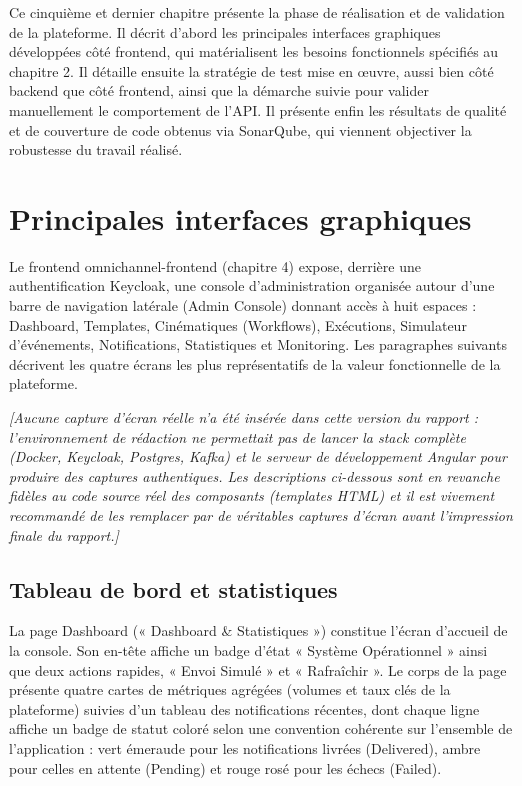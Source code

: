 \documentclass[12pt,a4paper]{report}
\newcommand{\placeholder}[1]{\par\smallskip\noindent\textcolor{placeholderred}{\itshape [#1]}\par\smallskip}
\begin{document}
Ce cinquième et dernier chapitre présente la phase de réalisation et de validation de la plateforme. Il décrit d'abord les principales interfaces graphiques développées côté frontend, qui matérialisent les besoins fonctionnels spécifiés au chapitre 2. Il détaille ensuite la stratégie de test mise en \oe uvre, aussi bien côté backend que côté frontend, ainsi que la démarche suivie pour valider manuellement le comportement de l'API. Il présente enfin les résultats de qualité et de couverture de code obtenus via SonarQube, qui viennent objectiver la robustesse du travail réalisé.

\section{Principales interfaces graphiques}

Le frontend omnichannel-frontend (chapitre 4) expose, derrière une authentification Keycloak, une console d'administration organisée autour d'une barre de navigation latérale (Admin Console) donnant accès à huit espaces : Dashboard, Templates, Cinématiques (Workflows), Exécutions, Simulateur d'événements, Notifications, Statistiques et Monitoring. Les paragraphes suivants décrivent les quatre écrans les plus représentatifs de la valeur fonctionnelle de la plateforme.

\placeholder{Aucune capture d'écran réelle n'a été insérée dans cette version du rapport : l'environnement de rédaction ne permettait pas de lancer la stack complète (Docker, Keycloak, Postgres, Kafka) et le serveur de développement Angular pour produire des captures authentiques. Les descriptions ci-dessous sont en revanche fidèles au code source réel des composants (templates HTML) et il est vivement recommandé de les remplacer par de véritables captures d'écran avant l'impression finale du rapport.}

\subsection{Tableau de bord et statistiques}

La page Dashboard (« Dashboard \& Statistiques ») constitue l'écran d'accueil de la console. Son en-tête affiche un badge d'état « Système Opérationnel » ainsi que deux actions rapides, « Envoi Simulé » et « Rafraîchir ». Le corps de la page présente quatre cartes de métriques agrégées (volumes et taux clés de la plateforme) suivies d'un tableau des notifications récentes, dont chaque ligne affiche un badge de statut coloré selon une convention cohérente sur l'ensemble de l'application : vert émeraude pour les notifications livrées (Delivered), ambre pour celles en attente (Pending) et rouge rosé pour les échecs (Failed).
\end{document}

